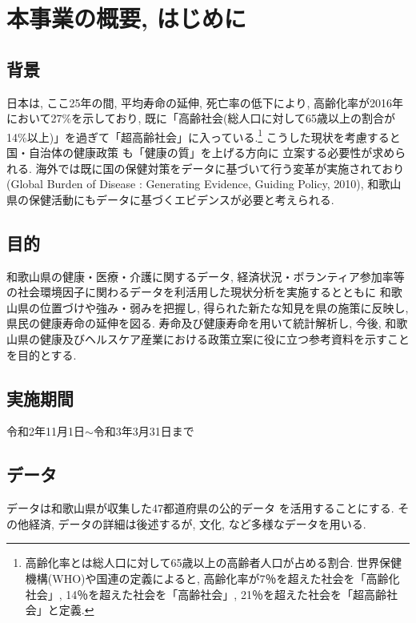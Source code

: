 
\chapter{本事業の概要, はじめに}
\section{背景}
日本は, ここ25年の間, 平均寿命の延伸, 死亡率の低下により, 高齢化率が2016年において27\%を示しており, 既に「高齢社会(総人口に対して65歳以上の割合が14\%以上)」を過ぎて「超高齢社会」に入っている.\footnote{
	高齢化率とは総人口に対して65歳以上の高齢者人口が占める割合. 世界保健機構(WHO)や国連の定義によると, 高齢化率が7％を超えた社会を「高齢化社会」, 14％を超えた社会を「高齢社会」, 21％を超えた社会を「超高齢社会」と定義.
}
こうした現状を考慮すると
国・自治体の健康政策
も「健康の質」を上げる方向に
立案する必要性が求められる.
海外では既に国の保健対策をデータに基づいて行う変革が実施されており(Global Burden of Disease :  Generating Evidence, Guiding Policy, 2010),
和歌山県の保健活動にもデータに基づくエビデンスが必要と考えられる.



\section{目的}
和歌山県の健康・医療・介護に関するデータ, 経済状況・ボランティア参加率等の社会環境因子に関わるデータを利活用した現状分析を実施するとともに
和歌山県の位置づけや強み・弱みを把握し,
得られた新たな知見を県の施策に反映し, 県民の健康寿命の延伸を図る.
寿命及び健康寿命を用いて統計解析し,
 今後, 和歌山県の健康及びヘルスケア産業における政策立案に役に立つ参考資料を示すことを目的とする.

\section{実施期間}
令和2年11月1日$\sim$令和3年3月31日まで


\section{データ}
データは和歌山県が収集した47都道府県の公的データ
を活用することにする.
その他経済, データの詳細は後述するが,
文化, など多様なデータを用いる.


